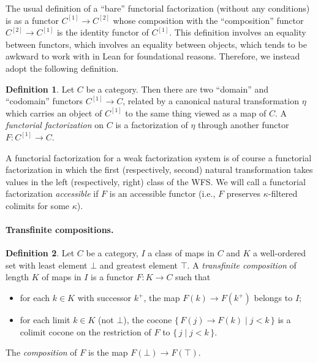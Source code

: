 \documentclass{article}
\theoremstyle{definition}
\newtheorem{definition}{Definition}[section]
\theoremstyle{plain}
\begin{document}
The usual definition of a ``bare'' functorial factorization (without any conditions) is as a functor $C^{[1]} \to C^{[2]}$ whose composition with the ``composition'' functor $C^{[2]} \to C^{[1]}$ is the identity functor of $C^{[1]}$.
This definition involves an equality between functors, which involves an equality between objects, which tends to be awkward to work with in Lean for foundational reasons.
Therefore, we instead adopt the following definition.

\begin{definition}
  Let $C$ be a category.
  Then there are two ``domain'' and ``codomain'' functors $C^{[1]} \to C$, related by a canonical natural transformation $\eta$ which carries an object of $C^{[1]}$ to the same thing viewed as a map of $C$.
  A \emph{functorial factorization} on $C$ is a factorization of $\eta$ through another functor $F : C^{[1]} \to C$.
\end{definition}

A functorial factorization for a weak factorization system is of course a functorial factorization in which the first (respectively, second) natural transformation takes values in the left (respectively, right) class of the WFS.
We will call a functorial factorization \emph{accessible} if $F$ is an accessible functor (i.e., $F$ preserves $\kappa$-filtered colimits for some $\kappa$).

\paragraph{Transfinite compositions.}

\begin{definition}
  Let $C$ be a category, $I$ a class of maps in $C$ and $K$ a well-ordered set with least element $\bot$ and greatest element $\top$.
  A \emph{transfinite composition} of length $K$ of maps in $I$ is a functor $F : K \to C$ such that
  \begin{itemize}
  \item for each $k \in K$ with successor $k^+$, the map $F(k) \to F(k^+)$ belongs to $I$;
  \item for each limit $k \in K$ (not $\bot$), the cocone $\{\,F(j) \to F(k) \mid j < k\,\}$ is a colimit cocone on the restriction of $F$ to $\{\,j \mid j < k\,\}$.
  \end{itemize}
  The \emph{composition} of $F$ is the map $F(\bot) \to F(\top)$.
\end{definition}
\end{document}

